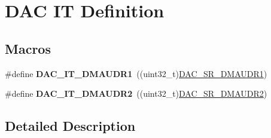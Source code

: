 \hypertarget{group___d_a_c___i_t__definition}{}\section{D\+AC IT Definition}
\label{group___d_a_c___i_t__definition}
\subsection*{Macros}
\begin{DoxyCompactItemize}
\item 
\mbox{\label{group___d_a_c___i_t__definition_ga359125b464a0e3632f4ec26abd3ea089}} 
\#define {\bfseries D\+A\+C\+\_\+\+I\+T\+\_\+\+D\+M\+A\+U\+D\+R1}~((uint32\+\_\+t)\mbox{\hyperlink{group___peripheral___registers___bits___definition_ga7d2048d6b521fb0946dc8c4e577a49c0}{D\+A\+C\+\_\+\+S\+R\+\_\+\+D\+M\+A\+U\+D\+R1}})
\item 
\mbox{\label{group___d_a_c___i_t__definition_gae4a7955aac74cd74def830e1da543f97}} 
\#define {\bfseries D\+A\+C\+\_\+\+I\+T\+\_\+\+D\+M\+A\+U\+D\+R2}~((uint32\+\_\+t)\mbox{\hyperlink{group___peripheral___registers___bits___definition_gaf16e48ab85d9261c5b599c56b14aea5d}{D\+A\+C\+\_\+\+S\+R\+\_\+\+D\+M\+A\+U\+D\+R2}})
\end{DoxyCompactItemize}


\subsection{Detailed Description}
